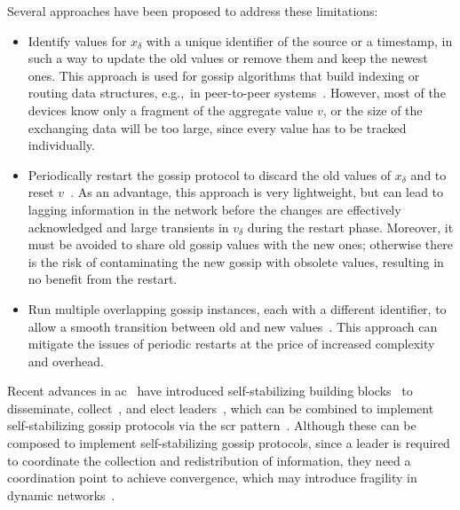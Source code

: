 \documentclass[runningheads]{llncs}
\begin{document}
Several approaches have been proposed to address these limitations:
\begin{itemize}
    \item Identify values for $x_{\delta}$ with a unique identifier of the source or a timestamp,
    in such a way to update the old values or remove them and keep the newest ones.
    This approach is used for gossip algorithms that build indexing or routing data structures,
    e.g.,\ in peer-to-peer systems~\cite{DBLP:conf/dsom/VoulgarisS03,DBLP:conf/iptps/GuptaBLDR03}.
    However, most of the devices know only a fragment of the aggregate value $v$,
    or the size of the exchanging data will be too large, since every value has to be tracked individually.
    \item Periodically restart the gossip protocol to discard the old values of $x_{\delta}$ and to reset $v$~\cite{DBLP:journals/tocs/JelasityMB05,DBLP:conf/europar/PruteanuID11}.
    As an advantage, this approach is very lightweight, but can lead to lagging information in the network before the changes
    are effectively acknowledged and large transients in $v_{\delta}$ during the restart phase.
    Moreover, it must be avoided to share old gossip values with the new ones;
    otherwise there is the risk of contaminating the new gossip with obsolete values,
    resulting in no benefit from the restart.
    \item Run multiple overlapping gossip instances, each with a different identifier,
    to allow a smooth transition between old and new values~\cite{DBLP:conf/coordination/PianiniBV16}.
    This approach can mitigate the issues of periodic restarts at the price of increased complexity and overhead.
\end{itemize}

Recent advances in \ac{ac}~\cite{BealIEEEComputer2015} have introduced self-stabilizing building
blocks~\cite{DBLP:journals/tomacs/ViroliABDP18} to disseminate, collect~\cite{DBLP:journals/cee/AudritoCDPV21},
and elect leaders~\cite{PianiniCV22,DBLP:journals/automatica/MoADB22},
which can be combined to implement self-stabilizing gossip protocols via the \ac{scr} pattern~\cite{FGCS2020-SCR}.
%
Although these can be composed to implement self-stabilizing gossip protocols,
since a leader is required to coordinate the collection and redistribution of information,
they need a coordination point to achieve convergence,
which may introduce fragility in dynamic networks~\cite{SCP2020-aggregate-centrality}.
\end{document}
